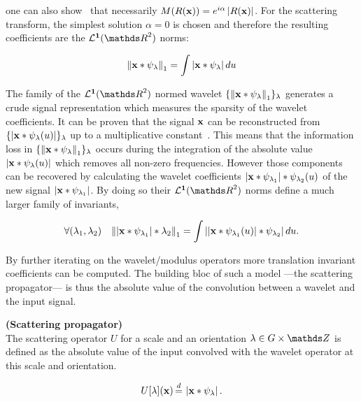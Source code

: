 \documentclass[a4paper,11pt]{report}
\begin{document}
      one can also show~\citep{bruna2012commute} that necessarily $M(R({\bf x}))= e^{i\alpha}\left| R({\bf x}) \right|$. For the scattering transform, the simplest solution $\alpha = 0$ is chosen and therefore the resulting coefficients are the $\mathbf{\mcalL^{1}}(\dsR^{2})$ norms:
       
      \begin{equation*}
				\label{eq:L1 norm}
				\left\lVert {\bf x} \ast \psi_{\lambda} \right\rVert_{1} = \int \left| {\bf x} \ast \psi_{\lambda} \right| du
      \end{equation*}      
      
      The family of the $\mathbf{\mcalL^{1}}(\dsR^{2})$ normed wavelet $\{ \left\lVert {\bf x} \ast \psi_{\lambda} \right\rVert_{1}\}_{\lambda}$ generates a crude signal representation which measures the sparsity of the wavelet coefficients. It can be proven that the signal ${\bf x}$ can be reconstructed from $\{\left| {\bf x} \ast \psi_{\lambda}(u) \right| \}_{\lambda}$ up to a multiplicative constant~\citep{waldspurger2015phase}. This means that the information loss in $\{\left\lVert {\bf x} \ast \psi_{\lambda} \right\rVert_{1} \}_{\lambda}$ occurs during the integration of the absolute value $\left| {\bf x} \ast \psi_{\lambda}(u) \right|$ which removes all non-zero frequencies. However those components can be recovered by calculating the wavelet coefficients $\left| {\bf x} \ast \psi_{\lambda_{1}} \right| \ast \psi_{\lambda_{2}}(u)$ of the new signal $\left| {\bf x} \ast \psi_{\lambda_{1}} \right|$. By doing so their $\mathbf{\mcalL^{1}}(\dsR^{2})$ norms define a much larger family of invariants,
      
      \begin{equation*}
				\label{eq:2nd order}
				\forall (\lambda_{1}, \lambda_{2}) \;\;\; 
				\left\lVert  \left| {\bf x} \ast \psi_{\lambda_{1}} \right| \ast \lambda_{2} \right\rVert_{1} =
				\int \left|  \left| {\bf x} \ast \psi_{\lambda_{1}}(u) \right| \ast \psi_{\lambda_{2}} \right| du.
      \end{equation*}          
      
      By further iterating on the wavelet/modulus operators more translation invariant coefficients can be computed. The building bloc of such a model ---the scattering propagator--- is thus the absolute value of the convolution between a wavelet and the input signal.
      
      \begin{defn} \textbf{(Scattering propagator)}\\ 
				The scattering operator $U$ for a scale and an orientation $\lambda \in G \times \dsZ$ is defined as the absolute value of the input convolved with the wavelet operator at this scale and orientation.
				
				\begin{equation}
					\label{eq:scattering propagator}
					U[\lambda](\bfx) \eqdef \abs{\bfx \ast \psi_{\lambda}}.
				\end{equation}
				\label{def:SO}
			\end{defn}
						
\end{document}
